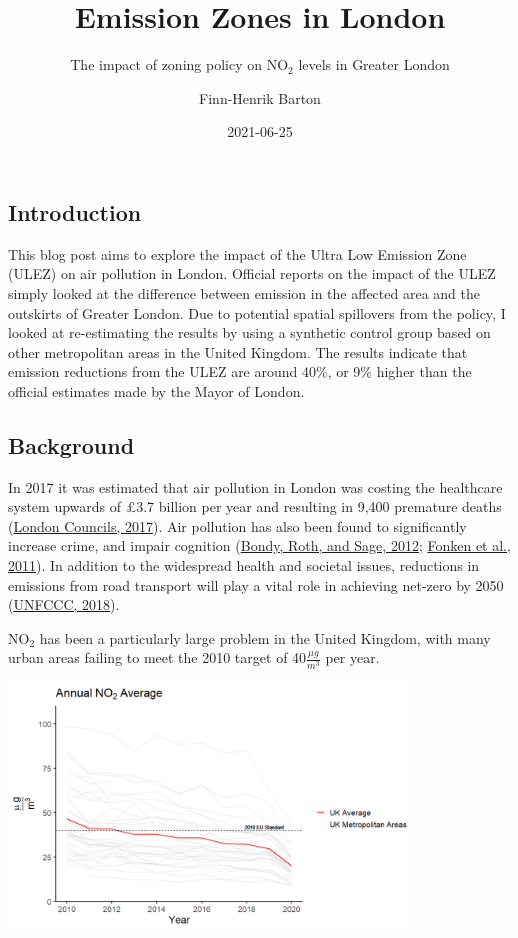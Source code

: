 \documentclass[
]{article}
\title{Emission Zones in London}
\subtitle{The impact of zoning policy on NO\(_2\) levels in Greater London}
\author{Finn-Henrik Barton}
\date{2021-06-25}
\begin{document}
\maketitle

\hypertarget{introduction}{%
\subsection{Introduction}\label{introduction}}

This blog post aims to explore the impact of the Ultra Low Emission Zone
(ULEZ) on air pollution in London. Official reports on the impact of the
ULEZ simply looked at the difference between emission in the affected
area and the outskirts of Greater London. Due to potential spatial
spillovers from the policy, I looked at re-estimating the results by
using a synthetic control group based on other metropolitan areas in the
United Kingdom. The results indicate that emission reductions from the
ULEZ are around 40\%, or 9\% higher than the official estimates made by
the Mayor of London.

\hypertarget{background}{%
\subsection{Background}\label{background}}

In 2017 it was estimated that air pollution in London was costing the
healthcare system upwards of £3.7 billion per year and resulting in
9,400 premature deaths
(\href{https://www.londoncouncils.gov.uk/node/33224}{London Councils,
2017}). Air pollution has also been found to significantly increase
crime, and impair cognition
(\href{https://www.journals.uchicago.edu/doi/full/10.1086/707127}{Bondy,
Roth, and Sage, 2012};
\href{https://www.nature.com/articles/mp201176}{Fonken et al., 2011}).
In addition to the widespread health and societal issues, reductions in
emissions from road transport will play a vital role in achieving
net-zero by 2050
(\href{https://unfccc.int/sites/default/files/resource/328_TransportDecarbonizationToolbox_TalanoaDialog.pdf}{UNFCCC,
2018}).

NO\(_2\) has been a particularly large problem in the United Kingdom,
with many urban areas failing to meet the 2010 target of
40\(\frac{\mu g}{m^3}\) per year.

\includegraphics[width=0.8\textwidth,height=\textheight]{no2AverageUK.png}
\end{document}
